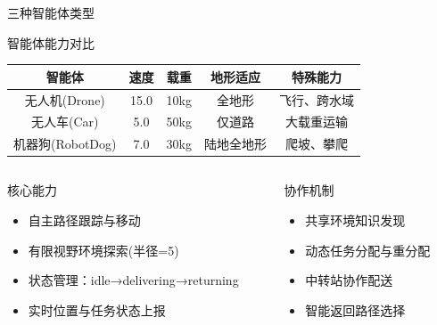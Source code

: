 \documentclass[
10pt,
aspectratio=169,
]{beamer}
\begin{document}
\begin{frame}{三种智能体类型}
    \begin{block}{智能体能力对比}
        \begin{center}
        \begin{tabular}{|c|c|c|c|c|}
        \hline
        \textbf{智能体} & \textbf{速度} & \textbf{载重} & \textbf{地形适应} & \textbf{特殊能力} \\
        \hline
        无人机(Drone) & 15.0 & 10kg & 全地形 & 飞行、跨水域 \\
        \hline
        无人车(Car) & 5.0 & 50kg & 仅道路 & 大载重运输 \\
        \hline
        机器狗(RobotDog) & 7.0 & 30kg & 陆地全地形 & 爬坡、攀爬 \\
        \hline
        \end{tabular}
        \end{center}
    \end{block}
    
    \begin{columns}
        \begin{column}{0.5\textwidth}
            \begin{exampleblock}{核心能力}
                \begin{itemize}
                    \item 自主路径跟踪与移动
                    \item 有限视野环境探索(半径=5)
                    \item 状态管理：idle→delivering→returning
                    \item 实时位置与任务状态上报
                \end{itemize}
            \end{exampleblock}
        \end{column}
        \begin{column}{0.5\textwidth}
            \begin{exampleblock}{协作机制}
                \begin{itemize}
                    \item 共享环境知识发现
                    \item 动态任务分配与重分配
                    \item 中转站协作配送
                    \item 智能返回路径选择
                \end{itemize}
            \end{exampleblock}
        \end{column}
    \end{columns}
\end{frame}
\end{document}
